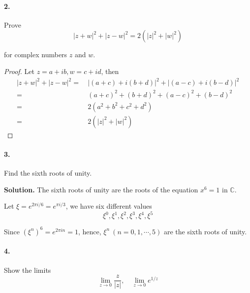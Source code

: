 \documentclass[12pt, a4paper, oneside]{article}
\newenvironment{solution}{\par\noindent\textbf{Solution. }}{\bigskip\par}
\begin{document}
\paragraph{2.}Prove \begin{equation*}
    |z+w|^2+|z-w|^2=2(|z|^2+|w|^2)
\end{equation*}

for complex numbers $z$ and $w$.
\begin{proof}
    Let $z = a+ib, w=c+id$, then
    \begin{equation*}
        \begin{aligned}
            |z+w|^2+|z-w|^2 =&\ |(a+c)+i(b+d)|^2+|(a-c)+i(b-d)|^2\\
            =&\ (a+c)^2+(b+d)^2+(a-c)^2+(b-d)^2\\
            =&\ 2(a^2+b^2+c^2+d^2)\\
            =&\ 2(|z|^2+|w|^2)
        \end{aligned}
    \end{equation*}
\end{proof}

\paragraph{3.} Find the sixth roots of unity.
\begin{solution}
    The sixth roots of unity are the roots of the equation $x^6 = 1$ in $\mathbb{C}$. 
    
    Let $\xi = e^{2\pi i / 6} = e^{\pi i / 3}$, we have six different values
    \begin{equation*}
        \xi^0, \xi^1, \xi^2, \xi^3, \xi^4,\xi^5
    \end{equation*}

    Since $(\xi^n)^6 = e^{2\pi in} = 1$, hence, $\xi^n\ (n=0,1,\cdots, 5)$ are the sixth roots of unity.
\end{solution}
\paragraph{4.} Show the limits\begin{equation*}
    \lim_{z\rightarrow 0}\frac{z}{|z|},\quad \lim_{z\rightarrow 0}e^{1/z}
\end{equation*}
\end{document}

